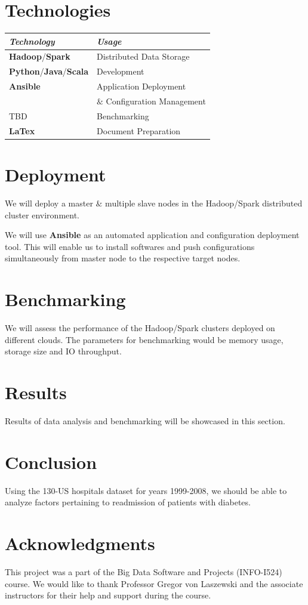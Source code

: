 \documentclass[9pt,twocolumn,twoside]{../../styles/osajnl}
\begin{document}
\section{Technologies}
\begin{center}
 \begin{tabular}{l l} 
 \hline
 \textit{Technology} & \textit{Usage}  \\  
 \hline 
 \textbf{Hadoop}\cite{www-hadoop}/\textbf{Spark} \cite{www-spark} & Distributed Data Storage  \\
 \hline
 \textbf{Python}\cite{www-python}/\textbf{Java}\cite{www-java}/\textbf{Scala}\cite{www-scala} & Development \\
 \hline
 \textbf{Ansible} \cite{www-ansible} & Application Deployment \\ & $\&$ Configuration Management \\
 \hline
 TBD & Benchmarking \\
 \hline
 \textbf{LaTex} \cite{www-latex} & Document Preparation \\
 \hline
\end{tabular}
\end{center}
    
\section{Deployment}
We will deploy a master $\&$ multiple slave nodes in the Hadoop/Spark distributed cluster environment. 

We will use \textbf{Ansible} as an automated application and configuration deployment tool. This will enable us to install softwares and push configurations simultaneously from master node to the respective target nodes. 

\section{Benchmarking}
We will assess the performance of the Hadoop/Spark clusters deployed on different clouds. The parameters for benchmarking would be memory usage, storage size and IO throughput.

    
    
\section{Results}
Results of data analysis and benchmarking will be showcased in this section.

\section{Conclusion}
Using the 130-US hospitals dataset \cite{www-dataset} for years 1999-2008, we should be able to analyze factors pertaining to readmission of patients with diabetes. 

\section{Acknowledgments}
This project was a part of the Big Data Software and Projects (INFO-I524) course. We would like to thank Professor Gregor von Laszewski and the associate instructors for their help and support during the course. 


\end{document}
